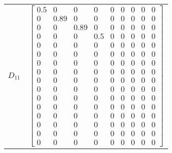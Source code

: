 \begin{tabular}{cl}
 $D_{11}$ & $\left[\begin{matrix}0.5 & 0 & 0 & 0 & 0 & 0 & 0 & 0 & 0\\0 & 0.89 & 0 & 0 & 0 & 0 & 0 & 0 & 0\\0 & 0 & 0.89 & 0 & 0 & 0 & 0 & 0 & 0\\0 & 0 & 0 & 0.5 & 0 & 0 & 0 & 0 & 0\\0 & 0 & 0 & 0 & 0 & 0 & 0 & 0 & 0\\0 & 0 & 0 & 0 & 0 & 0 & 0 & 0 & 0\\0 & 0 & 0 & 0 & 0 & 0 & 0 & 0 & 0\\0 & 0 & 0 & 0 & 0 & 0 & 0 & 0 & 0\\0 & 0 & 0 & 0 & 0 & 0 & 0 & 0 & 0\\0 & 0 & 0 & 0 & 0 & 0 & 0 & 0 & 0\\0 & 0 & 0 & 0 & 0 & 0 & 0 & 0 & 0\\0 & 0 & 0 & 0 & 0 & 0 & 0 & 0 & 0\\0 & 0 & 0 & 0 & 0 & 0 & 0 & 0 & 0\\0 & 0 & 0 & 0 & 0 & 0 & 0 & 0 & 0\\0 & 0 & 0 & 0 & 0 & 0 & 0 & 0 & 0\\0 & 0 & 0 & 0 & 0 & 0 & 0 & 0 & 0\end{matrix}\right]$                                                                                                                                                                                                                                                                                                                                                                                                                                                                                                                                                                                                                                                                                                                                                                                                                                                                                                                                                                                                                                                                                                                                                                                                                                                                                                                                                                                                                                                                                                                                                                                                                                                \\

\end{tabular}
